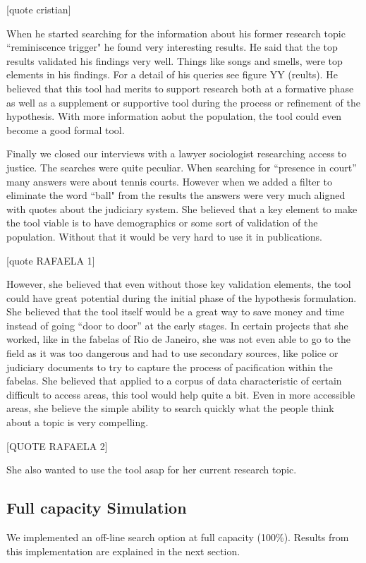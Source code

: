 \documentclass{sigchi}
\begin{document}
[quote cristian]

When he started searching for the information about his former research topic ``reminiscence trigger" he found very interesting results. He said that the top results validated his findings very well. Things like songs and smells, were top elements in his findings. For a detail of his queries see figure YY (reults). He believed that this tool had merits to support research both at a formative phase as well as a supplement or supportive tool during the process or refinement of the hypothesis. With more information aobut the population, the tool could even become a good formal tool.

Finally we closed our interviews with a lawyer sociologist researching access to justice. The searches were quite peculiar. When searching for ``presence in court'' many answers were about tennis courts. However when we added a filter to eliminate the word ``ball" from the results the answers were very much aligned with quotes about the judiciary system. She believed that a key element to make the tool viable is to have demographics or some sort of validation of the population. Without that it would be very hard to use it in publications.

[quote RAFAELA 1]

However, she believed that even without those key validation elements, the tool could have great potential during the initial phase of the hypothesis formulation. She believed that the tool itself would be a great way to save money and time instead of going ``door to door'' at the early stages. In certain projects that she worked, like in the fabelas of Rio de Janeiro, she was not even able to go to the field as it was too dangerous and had to use secondary sources, like police or judiciary documents to try to capture the process of pacification within the fabelas. She believed that applied to a corpus of data characteristic of certain difficult to access areas, this tool would help quite a bit. Even in more accessible areas, she believe the simple ability to search quickly what the people think about a topic is very compelling. 

[QUOTE RAFAELA 2]

She also wanted to use the tool asap for her current research topic.

\subsection{Full capacity Simulation}
We implemented an off-line search option at full capacity (100\%). Results from this implementation are explained in the next section.
\end{document}
